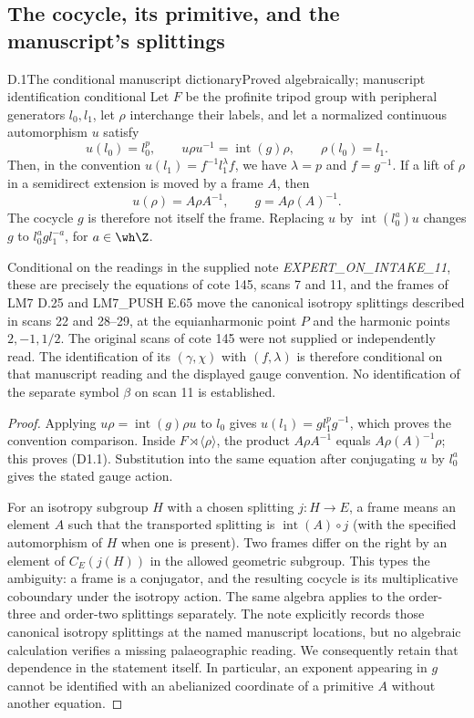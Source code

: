 \subsection{The cocycle, its primitive, and the manuscript's splittings}

\begin{statement}{D.1}{The conditional manuscript dictionary}{Proved algebraically; manuscript identification conditional}
Let $F$ be the profinite tripod group with peripheral generators $l_0,l_1$,
let $\rho$ interchange their labels, and let a normalized continuous
automorphism $u$ satisfy
\[
u(l_0)=l_0^p,\qquad u\rho u^{-1}=\operatorname{int}(g)\rho,
\qquad \rho(l_0)=l_1.
\]
Then, in the convention $u(l_1)=f^{-1}l_1^\lambda f$,
we have $\lambda=p$ and $f=g^{-1}$. If a lift of $\rho$ in a semidirect
extension is moved by a frame $A$, then
\[
u(\rho)=A\rho A^{-1},\qquad g=A\rho(A)^{-1}.
\tag{D1.1}
\]
The cocycle $g$ is therefore not itself the frame. Replacing $u$ by
$\operatorname{int}(l_0^a)u$ changes $g$ to
$l_0^a g l_1^{-a}$, for $a\in\wh\Z$.

Conditional on the readings in the supplied note
\emph{EXPERT\_ON\_INTAKE\_11}, these are precisely the equations of
cote 145, scans 7 and 11, and the frames of LM7 D.25 and LM7\_PUSH E.65
move the canonical isotropy splittings described in scans 22 and 28--29,
at the equianharmonic point $P$ and the harmonic points $2,-1,1/2$.
The original scans of cote 145 were not supplied or independently read.
The identification of its $(\gamma,\chi)$ with $(f,\lambda)$ is therefore
conditional on that manuscript reading and the displayed gauge convention.
No identification of the separate symbol $\beta$ on scan 11 is established.
\end{statement}
\begin{proof}
Applying $u\rho=\operatorname{int}(g)\rho u$ to $l_0$ gives
$u(l_1)=g l_1^p g^{-1}$, which proves the convention comparison.
Inside $F\rtimes\langle\rho\rangle$, the product
$A\rho A^{-1}$ equals $A\rho(A)^{-1}\rho$; this proves (D1.1).
Substitution into the same equation after conjugating $u$ by $l_0^a$
gives the stated gauge action.

For an isotropy subgroup $H$ with a chosen splitting $j:H\to E$, a
frame means an element $A$ such that the transported splitting is
$\operatorname{int}(A)\circ j$ (with the specified automorphism of $H$
when one is present). Two frames differ on the right by an element of
$C_E(j(H))$ in the allowed geometric subgroup. This types the ambiguity:
a frame is a conjugator, and the resulting cocycle is its multiplicative
coboundary under the isotropy action. The same algebra applies to the
order-three and order-two splittings separately. The note explicitly
records those canonical isotropy splittings at the named manuscript
locations, but no algebraic calculation verifies a missing palaeographic
reading. We consequently retain that dependence in the statement itself.
In particular, an exponent appearing in $g$ cannot be identified with an
abelianized coordinate of a primitive $A$ without another equation.
\end{proof}

